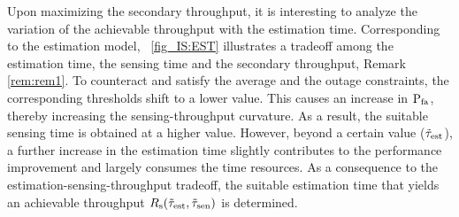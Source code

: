 {Upon maximizing the secondary throughput, it is interesting to analyze the variation of the achievable throughput with the estimation time. Corresponding to the estimation model, \figurename~\ref{fig_IS:EST} illustrates a tradeoff among the estimation time, the sensing time and the secondary throughput,  Remark \ref{rem:rem1}.  To counteract and satisfy the average and the outage constraints, the corresponding thresholds shift to a lower value. This causes an increase in $\text{P}_{\text{fa}}$, thereby increasing the sensing-throughput curvature. As a result, the suitable sensing time is obtained at a higher value. However, beyond a certain value ($\tilde{\tau}_{\text{est}}$), a further increase in the estimation time slightly contributes to the performance improvement and largely consumes the time resources. As a consequence to the estimation-sensing-throughput tradeoff, the suitable estimation time that yields an achievable throughput $R_{\text{s}}(\tilde{\tau}_{\text{est}},\tilde{\tau}_{\text{sen}})$ is determined. 

\begin{figure}[!ht]


\centering
{}
\end{figure}}
